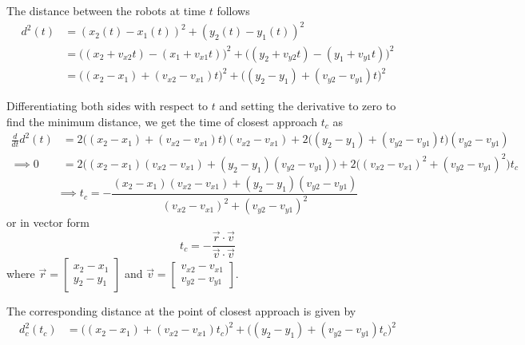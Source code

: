 The distance between the robots at time \( t \) follows
\begin{align*}
    d^2(t)
     & =
    (x_2(t) - x_1(t))^2 + (y_2(t) - y_1(t))^2
    \\ & =
    \big((x_2 + v_{x2}t) - (x_1 + v_{x1}t)\big)^2 + \big((y_2 + v_{y2}t) - (y_1 + v_{y1}t)\big)^2
    \\ & =
    \big((x_2 - x_1) + (v_{x2} - v_{x1})t\big)^2 + \big((y_2 - y_1) + (v_{y2} - v_{y1})t\big)^2
\end{align*}

Differentiating both sides with respect to \( t \) and setting the derivative to zero to find the minimum distance, we get the time of closest approach \( t_c \) as
\begin{align*}
    \frac{d}{dt}d^2(t)
     & =
    2\big((x_2 - x_1) + (v_{x2} - v_{x1})t\big)(v_{x2} - v_{x1}) + 2\big((y_2 - y_1) + (v_{y2} - v_{y1})t\big)(v_{y2} - v_{y1})
    \\ \implies
    0
     & =
    2\big((x_2 - x_1)(v_{x2} - v_{x1}) + (y_2 - y_1)(v_{y2} - v_{y1})\big) + 2\big((v_{x2} - v_{x1})^2 + (v_{y2} - v_{y1})^2\big) t_c
\end{align*}
\begin{equation*}
    \implies
    \boxed{
        t_c
        =
        -\frac{(x_2 - x_1)(v_{x2} - v_{x1}) + (y_2 - y_1)(v_{y2} - v_{y1})}{(v_{x2} - v_{x1})^2 + (v_{y2} - v_{y1})^2}
    }
\end{equation*}
or in vector form
\begin{equation*}
    t_c
    =
    -\frac{\vec{r} \cdot \vec{v}}{\vec{v} \cdot \vec{v}}
\end{equation*}
where \( \vec{r} = \begin{bmatrix} x_2 - x_1 \\ y_2 - y_1 \end{bmatrix} \) and \( \vec{v} = \begin{bmatrix} v_{x2} - v_{x1} \\ v_{y2} - v_{y1} \end{bmatrix} \).

The corresponding distance at the point of closest approach is given by
\begin{align*}
    d_c^2(t_c)
     & =
    \big((x_2 - x_1) + (v_{x2} - v_{x1})t_c\big)^2 + \big((y_2 - y_1) + (v_{y2} - v_{y1})t_c\big)^2
\end{align*}
